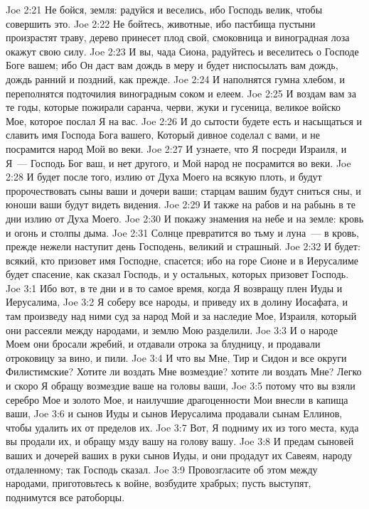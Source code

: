 \vs Joe 2:21 Не бойся, земля: радуйся и веселись, ибо Господь велик, чтобы совершить это.
\vs Joe 2:22 Не бойтесь, животные, ибо пастбища пустыни произрастят траву, дерево принесет плод свой, смоковница и виноградная лоза окажут свою силу.
\vs Joe 2:23 И вы, чада Сиона, радуйтесь и веселитесь о Господе Боге вашем; ибо Он даст вам дождь в меру и будет ниспосылать вам дождь, дождь ранний и поздний, как прежде.
\vs Joe 2:24 И наполнятся гумна хлебом, и переполнятся подточилия виноградным соком и елеем.
\vs Joe 2:25 И воздам вам за те годы, которые пожирали саранча, черви, жуки и гусеница, великое войско Мое, которое послал Я на вас.
\vs Joe 2:26 И до сытости будете есть и насыщаться и славить имя Господа Бога вашего, Который дивное соделал с вами, и не посрамится народ Мой во веки.
\vs Joe 2:27 И узнаете, что Я посреди Израиля, и Я~--- Господь Бог ваш, и нет другого, и Мой народ не посрамится во веки.
\rsbpar\vs Joe 2:28 И будет после того, излию от Духа Моего на всякую плоть, и будут пророчествовать сыны ваши и дочери ваши; старцам вашим будут сниться сны, и юноши ваши будут видеть видения.
\vs Joe 2:29 И также на рабов и на рабынь в те дни излию от Духа Моего.
\vs Joe 2:30 И покажу знамения на небе и на земле: кровь и огонь и столпы дыма.
\vs Joe 2:31 Солнце превратится во тьму и луна~--- в кровь, прежде нежели наступит день Господень, великий и страшный.
\vs Joe 2:32 И будет: всякий, кто призовет имя Господне, спасется; ибо на горе Сионе и в Иерусалиме будет спасение, как сказал Господь, и у остальных, которых призовет Господь.
\vs Joe 3:1 Ибо вот, в те дни и в то самое время, когда Я возвращу плен Иуды и Иерусалима,
\vs Joe 3:2 Я соберу все народы, и приведу их в долину Иосафата, и там произведу над ними суд за народ Мой и за наследие Мое, Израиля, который они рассеяли между народами, и землю Мою разделили.
\vs Joe 3:3 И о народе Моем они бросали жребий, и отдавали отрока за блудницу, и продавали отроковицу за вино, и пили.
\vs Joe 3:4 И что вы Мне, Тир и Сидон и все округи Филистимские? Хотите ли воздать Мне возмездие? хотите ли воздать Мне? Легко и скоро Я обращу возмездие ваше на головы ваши,
\vs Joe 3:5 потому что вы взяли серебро Мое и золото Мое, и наилучшие драгоценности Мои внесли в капища ваши,
\vs Joe 3:6 и сынов Иуды и сынов Иерусалима продавали сынам Еллинов, чтобы удалить их от пределов их.
\vs Joe 3:7 Вот, Я подниму их из того места, куда вы продали их, и обращу мзду вашу на голову вашу.
\vs Joe 3:8 И предам сыновей ваших и дочерей ваших в руки сынов Иуды, и они продадут их Савеям, народу отдаленному; так Господь сказал.
\rsbpar\vs Joe 3:9 Провозгласите об этом между народами, приготовьтесь к войне, возбудите храбрых; пусть выступят, поднимутся все ратоборцы.

